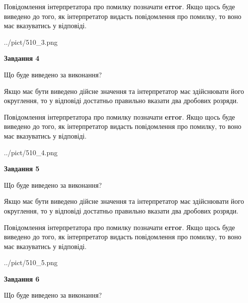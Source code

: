 \documentclass[12pt, ukrainian]{article}
\begin{document}
{\begin {Large}
Повідомлення інтерпретатора про помилку позначати \textbf{error}.
Якщо щось буде виведено до того, як інтерпретатор видасть повідомлення про помилку, 
то воно має вказуватись у відповіді. \par

\begin{center}
	{../pict/510_3.png}
\end{center}
\newpage

{\begin {center}\textbf{Завдання 4}\end {center}}\par
Що буде виведено за виконання? \par

Якщо має бути виведено дійсне значення та інтерпретатор має здійснювати його округлення, 
то у відповіді достатньо правильно вказати два дробових розряди.

Повідомлення інтерпретатора про помилку позначати \textbf{error}.
Якщо щось буде виведено до того, як інтерпретатор видасть повідомлення про помилку, 
то воно має вказуватись у відповіді. \par

\begin{center}
	{../pict/510_4.png}
\end{center}
\newpage

{\begin {center}\textbf{Завдання 5}\end {center}}\par
Що буде виведено за виконання? \par

Якщо має бути виведено дійсне значення та інтерпретатор має здійснювати його округлення, 
то у відповіді достатньо правильно вказати два дробових розряди.

Повідомлення інтерпретатора про помилку позначати \textbf{error}.
Якщо щось буде виведено до того, як інтерпретатор видасть повідомлення про помилку, 
то воно має вказуватись у відповіді. \par

\begin{center}
	{../pict/510_5.png}
\end{center}
\newpage

{\begin {center}\textbf{Завдання 6}\end {center}}\par
Що буде виведено за виконання? \par


\end{Large}}
\end{document}

